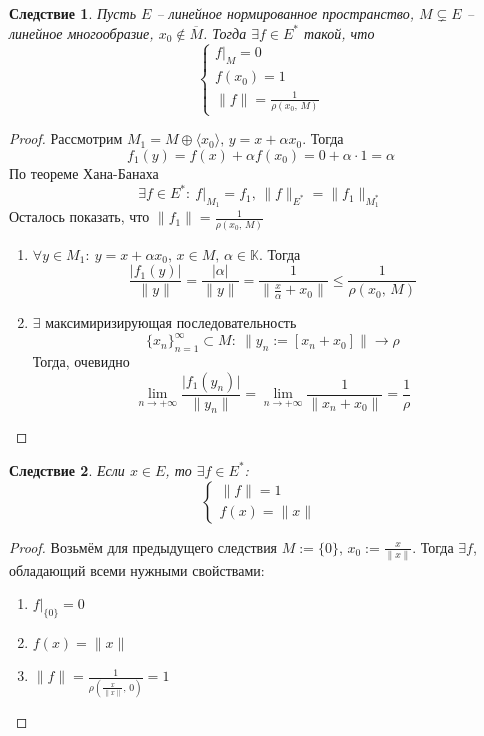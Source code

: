 \documentclass[a4paper,12pt]{article}
\renewcommand{\leq}{\ensuremath{\leqslant}}
\theoremstyle{plain}
\newtheorem*{corollary}{Следствие}
\theoremstyle{definition}
\theoremstyle{remark}
\begin{document}
\begin{corollary}
	Пусть $E$ -- линейное нормированное пространство, $M \subsetneq E$ -- линейное многообразие, $x_0 \not\in \overline{M}$. Тогда $\exists f \in E^*$ такой, что
	\[
		\begin{cases}
			f|_M = 0   \\
			f(x_0) = 1 \\
			\|f\| = \frac{1}{\rho(x_0,\, M)}
		\end{cases}
	\]
\end{corollary}

\begin{proof}
	Рассмотрим $M_1 = M \oplus \langle x_0\rangle,\, y = x + \alpha x_0$. Тогда
	\[
		f_1(y) = f(x) + \alpha f(x_0) = 0 + \alpha\cdot 1 = \alpha
	\]
	По теореме Хана-Банаха
	\[
		\exists f \in E^* :\: f|_{M_1} = f_1,\, \|f\|_{E^*} = \|f_1\|_{M_1^*}
	\]
	Осталось показать, что $\|f_1\| = \frac{1}{\rho(x_0,\, M)}$
	\begin{enumerate}
		\item $\forall y \in M_1 :\: y = x + \alpha x_0,\, x \in M,\, \alpha \in \mathbb{K}$. Тогда
		      \[
			      \frac{\vert f_1(y)\vert}{\|y\|} = \frac{\vert \alpha\vert}{\|y\|} = \frac{1}{\|\frac{x}{\alpha} + x_0\|} \leq \frac{1}{\rho(x_0,\, M)}
		      \]
		\item $\exists$ максимиризирующая последовательность
		      \[
			      \{x_n\}_{n = 1}^\infty \subset M :\: \|y_n := [x_n + x_0]\| \to \rho
		      \]
		      Тогда, очевидно
		      \[
			      \lim_{n \to +\infty} \frac{\vert f_1(y_n)\vert}{\|y_n\|} = \lim_{n \to +\infty}\frac{1}{\|x_n + x_0\|} = \frac{1}{\rho}
		      \]
	\end{enumerate}
\end{proof}

\begin{corollary}
	Если $x \in E$, то $\exists f \in E^*$:
	\[
		\begin{cases}
			\|f\| = 1 \\
			f(x) = \|x\|
		\end{cases}
	\]
\end{corollary}

\begin{proof}
	Возьмём для предыдущего следствия $M := \{0\},\, x_0 := \frac{x}{\|x\|}$. Тогда $\exists f$, обладающий всеми нужными свойствами:
	\begin{enumerate}
		\item $f|_{\{0\}} = 0$
		\item $f(x) = \|x\|$
		\item $\|f\| = \frac{1}{\rho(\frac{x}{\|x\|},\, 0)} = 1$
	\end{enumerate}
\end{proof}
\end{document}
